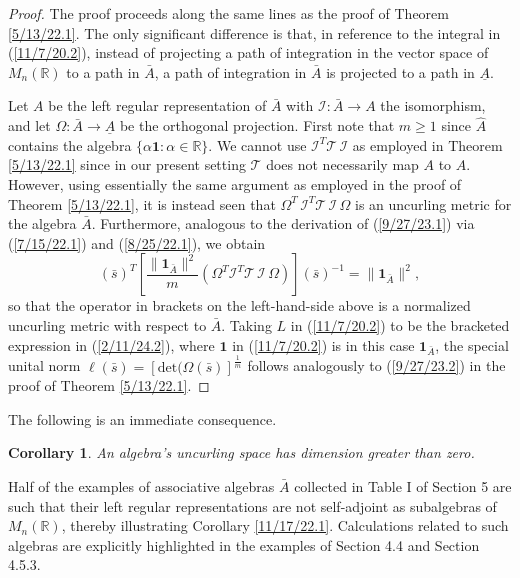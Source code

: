\documentclass{amsart}
\numberwithin{equation}{section}
\newtheorem{corollary}[theorem]{Corollary}
\theoremstyle{definition}
\numberwithin{theorem}{section}
\begin{document}
  \begin{proof} The proof proceeds along the same lines as the proof of Theorem \ref{5/13/22.1}.  The only significant difference is that, in reference to the integral in (\ref{11/7/20.2}), instead of projecting a path of integration in the vector space of $M_n(\mathbb{R})$ to a path in $\bar{A}$, a path of integration in $\bar{A}$ is projected to a path in $\underline{A}$.
 
Let $A$ be the left regular representation of $\bar{A}$ with $\mathcal{I}:\bar{A}\rightarrow A$ the isomorphism, and let $\Omega: \bar{A}\rightarrow\underline{A}$ be the orthogonal projection.  First note that $m\ge 1$ since $\hat{A}$ contains the algebra $\{\alpha\mathbf{1}:\alpha\in\mathbb{R}\}$.  We cannot use $\mathcal{I}^T\mathcal{T}\,\mathcal{I}$  as employed in Theorem \ref{5/13/22.1} since in our present setting $\mathcal{T}$ does not necessarily map $A$ to $A$. However, using essentially the same argument as employed in the proof of Theorem \ref{5/13/22.1}, it is instead seen that $\Omega^T\,\mathcal{I}^T\mathcal{T}\,\mathcal{I}\,\Omega$ is an uncurling metric for the algebra $\bar{A}$.  Furthermore, analogous to the derivation of (\ref{9/27/23.1}) via (\ref{7/15/22.1}) and (\ref{8/25/22.1}), we obtain
 \begin{equation}\label{2/11/24.2}
 (\bar{s})^T \left[ \frac{\|\mathbf{1}_{\bar{A}}\|^2}{m} (\Omega^T\mathcal{I}^T\mathcal{T}\,\mathcal{I}\,\Omega)\right](\bar{s})^{-1}
  = \|\mathbf{1}_{\bar{A}}\|^2,\end{equation} so that the operator in brackets on the left-hand-side above is a normalized uncurling metric with respect to $\bar{A}$.  Taking $L$ in (\ref{11/7/20.2}) to be the bracketed expression in (\ref{2/11/24.2}), where $\mathbf{1}$ in (\ref{11/7/20.2}) is in this case $\mathbf{1}_{\bar{A}}$, the special unital norm $\ell(\bar{s}) = [\mbox{det}(\Omega(\bar{s})]^{\frac{1}{m}}$ follows analogously to (\ref{9/27/23.2}) in the proof of Theorem \ref{5/13/22.1}.
 \end{proof}
 

 The following is an immediate consequence.   
 \begin{corollary}\label{1/1/23.1} An algebra's uncurling space has dimension greater than zero. \end{corollary}
  
Half of the examples of associative algebras $\bar{A}$ collected in Table I of Section 5 are such that their left regular representations are not self-adjoint as subalgebras of $M_n(\mathbb{R})$, thereby illustrating Corollary \ref{11/17/22.1}.  Calculations related to such algebras are explicitly highlighted in the examples of Section 4.4 and Section 4.5.3.
\end{document}
